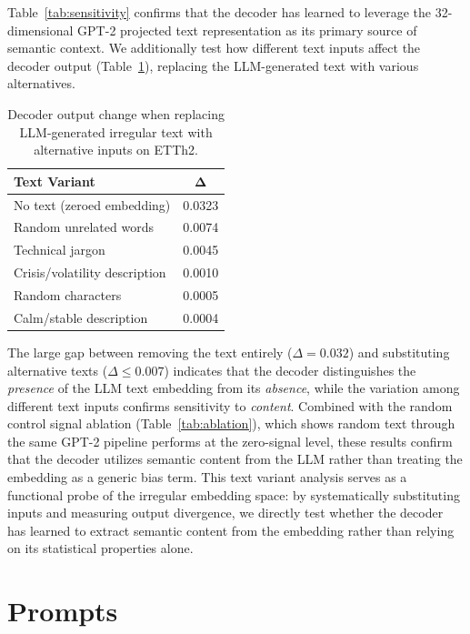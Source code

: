 Table~\ref{tab:sensitivity} confirms that the decoder has learned to leverage the 32-dimensional GPT-2 projected text representation as its primary source of semantic context. We additionally test how different text inputs affect the decoder output (Table~\ref{tab:text_variants}), replacing the LLM-generated text with various alternatives.

\begin{table}[H]
\centering
\small
\begin{tabular}{lc}
\toprule
\textbf{Text Variant} & $\boldsymbol{\Delta}$ \\
\midrule
No text (zeroed embedding) & 0.0323 \\
Random unrelated words & 0.0074 \\
Technical jargon & 0.0045 \\
Crisis/volatility description & 0.0010 \\
Random characters & 0.0005 \\
Calm/stable description & 0.0004 \\
\bottomrule
\end{tabular}
\caption{Decoder output change when replacing LLM-generated irregular text with alternative inputs on ETTh2.}
\label{tab:text_variants}
\end{table}

The large gap between removing the text entirely ($\Delta = 0.032$) and substituting alternative texts ($\Delta \leq 0.007$) indicates that the decoder distinguishes the \emph{presence} of the LLM text embedding from its \emph{absence}, while the variation among different text inputs confirms sensitivity to \emph{content}. Combined with the random control signal ablation (Table~\ref{tab:ablation}), which shows random text through the same GPT-2 pipeline performs at the zero-signal level, these results confirm that the decoder utilizes semantic content from the LLM rather than treating the embedding as a generic bias term. This text variant analysis serves as a functional probe of the irregular embedding space: 
by systematically substituting inputs and measuring output divergence, we directly test 
whether the decoder has learned to extract semantic content from the embedding rather 
than relying on its statistical properties alone.


\section{Prompts}
\label{sec:appendix_prompts}


